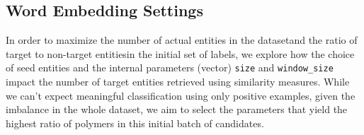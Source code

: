 \subsection{Word Embedding Settings}
In order to maximize the number of actual entities in the dataset\textemdash and the ratio of target to non-target entities\textemdash in the initial set of labels,
we explore how the choice of seed entities and the internal parameters (vector) \texttt{size} and \texttt{window_size} impact the number of target entities retrieved using similarity measures.
While we can't expect meaningful classification using only positive examples, given the imbalance in the whole dataset, we aim to select the parameters that yield the highest ratio of polymers in this initial batch of candidates.


